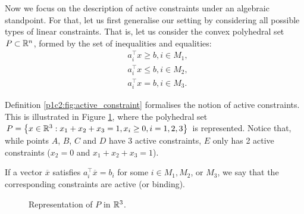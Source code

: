 Now we focus on the description of active constraints under an algebraic standpoint. For that, let us first generalise our setting by considering all possible types of linear constraints. That is, let us consider the convex polyhedral set $P \subset \mathbb{R}^n$, formed by the set of inequalities and equalities:
%
\begin{align*}
	& a_i^\top x \geq b, i \in M_1, \\ 
	& a_i^\top x \leq b, i \in M_2, \\
	& a_i^\top x = b, i \in M_3.
\end{align*}

Definition \ref{p1c2:fig:active_constraint} formalises the notion of active constraints. This is illustrated in Figure \ref{p1c2:fig:active_constraints}, where the polyhedral set $P = \left\{ x \in \mathbb{R}^3 : x_1 + x_2 + x_3 = 1, x_i \geq 0, i =1,2,3 \right \}$ is represented. Notice that, while points $A$, $B$, $C$ and $D$ have 3 active constraints, $E$ only has 2 active constraints ($x_2 = 0$ and $x_1 + x_2 + x_3 = 1$).

\begin{definition} \label{p1c2:fig:active_constraint}
	If a vector $\overline{x}$ satisfies $a_i^\top \overline{x} = b_i$ for some $i \in M_1, M_2$, or $M_3$, we say that the corresponding constraints are active (or binding).
\end{definition}

\begin{figure}[h]
	\caption{Representation of $P$ in $\mathbb{R}^3$.} \label{p1c2:fig:active_constraints}
\end{figure}	



